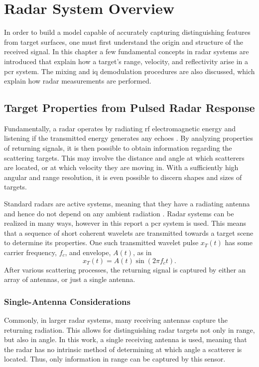 \chapter{Radar System Overview}

In order to build a model capable of accurately capturing distinguishing features from target surfaces, one must first understand the origin and structure of the received signal. In this chapter a few fundamental concepts in radar systems are introduced that explain how a target's range, velocity, and reflectivity arise in a \gls{pcr} system. The mixing and \gls{iq} demodulation procedures are also discussed, which explain how radar measurements are performed.  

\section{Target Properties from Pulsed Radar Response}
Fundamentally, a radar operates by radiating \gls{rf} electromagnetic energy and listening if the transmitted energy generates any echoes \citep{skolnik_2009}. By analyzing properties of returning signals, it is then possible to obtain information regarding the scattering targets. This may involve the distance and angle at which scatterers are located, or at which velocity they are moving in. With a sufficiently high angular and range resolution, it is even possible to discern shapes and sizes of targets.  

Standard radars are active systems, meaning that they have a radiating antenna and hence do not depend on any ambient radiation \citep{richards_2014}. Radar systems can be realized in many ways, however in this report a \gls{pcr} system is used. This means that a sequence of short coherent wavelets are transmitted towards a target scene to determine its properties. One such transmitted wavelet pulse $x_T(t)$ has some carrier frequency, $f_c$, and envelope, $A(t)$, as in
\begin{equation}\label{eq:trans}
	x_T(t)
	= A(t)\sin(2\pi f_c t).
\end{equation}
After various scattering processes, the returning signal is captured by either an array of antennas, or just a single antenna.

\subsection{Single-Antenna Considerations}
\label{single_antenna}

Commonly, in larger radar systems, many receiving antennas capture the returning radiation. This allows for distinguishing radar targets not only in range, but also in angle. In this work, a single receiving antenna is used, meaning that the radar has no intrinsic method of determining at which angle a scatterer is located. Thus, only information in range can be captured by this sensor.

